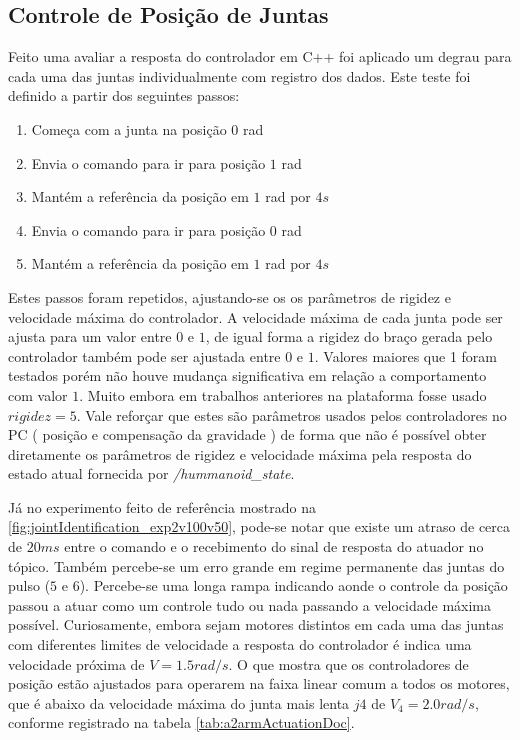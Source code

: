 \subsection{Controle de Posição de Juntas}\label{subsec:stepcpp}

Feito uma avaliar a resposta do controlador em C++ foi aplicado um degrau para cada uma das juntas individualmente com registro dos dados. Este teste foi definido a partir dos seguintes passos:

\begin{enumerate}
    \item Começa com a junta na posição $0$ rad
    \item Envia o comando para ir para posição $1$ rad
    \item Mantém a referência da posição em $1$ rad por $4s$
    \item Envia o comando para ir para posição $0$ rad
    \item Mantém a referência da posição em $1$ rad por $4s$
\end{enumerate}

Estes passos foram repetidos, ajustando-se os os parâmetros de rigidez e velocidade máxima do controlador. A velocidade máxima de cada junta pode ser ajusta para um valor entre $0$ e $1$, de igual forma a rigidez do braço gerada pelo controlador também pode ser ajustada entre $0$ e $1$. Valores maiores que 1 foram testados porém não houve mudança significativa em relação a comportamento com valor $1$. Muito embora em trabalhos anteriores na plataforma fosse usado $rigidez = 5$. Vale reforçar que estes são parâmetros usados pelos controladores no PC ( posição e compensação da gravidade ) de forma que não é possível obter diretamente os parâmetros de rigidez e velocidade máxima pela resposta do estado atual fornecida por \textit{/hummanoid\_state}.

Já no experimento feito de referência mostrado na \ref{fig:jointIdentification_exp2v100v50}, pode-se notar que existe um atraso de cerca de $20ms$ entre o comando e o recebimento do sinal de resposta do atuador no tópico. Também percebe-se um erro grande em regime permanente das juntas do pulso ($5$ e $6$). Percebe-se uma longa rampa indicando aonde o controle da posição passou a atuar como um controle tudo ou nada passando a velocidade máxima possível. Curiosamente, embora sejam motores distintos em cada uma das juntas com diferentes limites de velocidade a resposta do controlador é indica uma velocidade próxima de $V = 1.5 rad/s$. O que mostra que os controladores de posição estão ajustados para operarem na faixa linear comum a todos os motores, que é abaixo da velocidade máxima do junta mais lenta $j4$ de $V_4 = 2.0 rad/s$, conforme registrado na tabela \ref{tab:a2armActuationDoc}.

